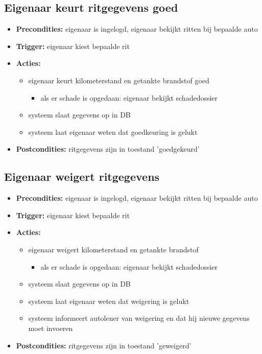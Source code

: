 \documentclass[]{article}
\begin{document}
\subsection{Eigenaar keurt ritgegevens goed}
\begin{itemize}
\item \textbf{Precondities:} eigenaar is ingelogd, eigenaar bekijkt ritten bij bepaalde auto
\item \textbf{Trigger:} eigenaar kiest bepaalde rit
\item \textbf{Acties:} \begin{itemize}
\item eigenaar keurt kilometerstand en getankte brandstof goed
\begin{itemize}
	\item als er schade is opgedaan: eigenaar bekijkt schadedossier
\end{itemize}
	
\item	systeem slaat gegevens op in DB
\item      systeem laat eigenaar weten dat goedkeuring is gelukt
\end{itemize}
\item \textbf{Postcondities:} ritgegevens zijn in toestand 'goedgekeurd'
\end{itemize}

\subsection{Eigenaar weigert ritgegevens}
\begin{itemize}
\item \textbf{Precondities:} eigenaar is ingelogd, eigenaar bekijkt ritten bij bepaalde auto
\item \textbf{Trigger:} eigenaar kiest bepaalde rit
\item \textbf{Acties:} \begin{itemize}
\item eigenaar weigert kilometerstand en getankte brandstof
\begin{itemize}
	\item als er schade is opgedaan: eigenaar bekijkt schadedossier
\end{itemize}
	
\item	systeem slaat gegevens op in DB
\item      systeem laat eigenaar weten dat weigering is gelukt
\item	systeem informeert autolener van weigering en dat hij nieuwe gegevens moet invoeren
\end{itemize}
\item \textbf{Postcondities:} ritgegevens zijn in toestand 'geweigerd'
\end{itemize}
\end{document}
